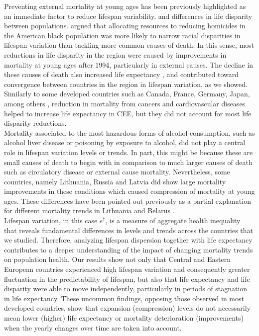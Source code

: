 \documentclass{article}
\begin{document}
\begin{spacing}{1.5}
Preventing external mortality at young ages has been previously highlighted as an immediate factor to reduce lifespan variability, and differences in life disparity between populations. \citet{firebaugh2014lifespans} argued that allocating resources to reducing homicides in the American black population was more likely to narrow racial disparities in lifespan variation than tackling more common causes of death. In this sense, most reductions in life disparity in the region were caused by improvements in mortality at young ages after 1994, particularly in external causes. The decline in these causes of death also increased life expectancy \citep{trias2017contribution}, and contributed toward convergence between countries in the region in lifespan variation, as we showed. Similarly to some developed countries such as Canada, France, Germany, Japan, among others \citep{seligman2016equity}, reduction in mortality from cancers and cardiovascular diseases helped to increase life expectancy in CEE, but they did not account for most life disparity reductions.\\

Mortality associated to the most hazardous forms of alcohol consumption, such as alcohol liver disease or poisoning by exposure to alcohol, did not play a central role in lifespan variation levels or trends. In part, this might be because these are small causes of death to begin with in comparison to much larger causes of death such as circulatory disease or external cause mortality. Nevertheless, some countries, namely Lithuania, Russia and Latvia did show large mortality improvements in these conditions which caused compression of mortality at young ages. These differences have been pointed out previously as a partial explanation for different mortality trends in Lithuania and Belarus \citep{grigoriev2015spatial}.\\

Lifespan variation, in this case $e^\dagger$, is a measure of aggregate health inequality that reveals fundamental differences in levels and trends across the countries that we studied. Therefore, analyzing lifespan dispersion together with life expectancy contributes to a deeper understanding of the impact of changing mortality trends on population health. Our results show not only that Central and Eastern European countries experienced high lifespan variation and consequently greater fluctuation in the predictability of lifespan, but also that life expectancy and life disparity were able to move independently, particularly in periods of stagnation in life expectancy. These uncommon findings, opposing those observed in most developed countries, show that expansion (compression) levels do not necessarily mean lower (higher) life expectancy  or mortality deterioration (improvements) when the yearly changes over time are taken into account. \\


\end{spacing}
\end{document}
